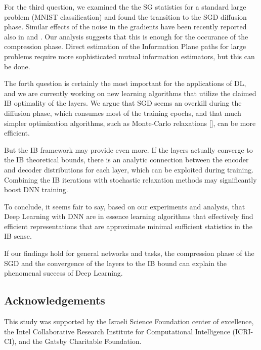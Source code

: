 \documentclass[11pt]{article}
\begin{document}
For the third question, we examined the the SG statistics for a standard large problem (MNIST classification) and found the transition to the SGD diffusion phase. Similar effects of the noise in the gradients have been recently reported also in \citet{2016arXiv161101353A} and \citet{DBLP:journals/corr/BalduzziFLLMM17}. Our analysis suggests that this is enough for the occurance of the compression phase. Direct estimation of the Information Plane paths for large problems require more sophisticated mutual information estimators, but this can be done. 

The forth question is certainly the most important for the applications of DL, and we are currently working on new learning algorithms that utilize the claimed IB optimality of the layers. We argue that SGD seems an overkill during the diffusion phase, which consumes most of the training epochs, and that much simpler optimization algorithms, such as Monte-Carlo relaxations [\citet{geman1988stochastic}], can be more efficient.  

But the IB framework may provide even more. If the layers actually converge to the IB theoretical bounds, there is an analytic connection between the encoder and decoder distributions for each layer, which can be exploited during training. Combining the IB iterations with stochastic relaxation methods may significantly boost DNN training.   



To conclude, it seems fair to say, based on our experiments and analysis, that Deep Learning with DNN 
are in essence learning algorithms that effectively find efficient representations that are approximate minimal sufficient statistics in the IB sense.  

If our findings hold for general networks and tasks, the compression phase of the SGD and the convergence of the layers to the IB bound can explain the phenomenal success of Deep Learning.




\subsection*{Acknowledgements} 
This study was supported by the Israeli Science Foundation center of excellence, the
Intel Collaborative Research Institute for Computational Intelligence (ICRI-CI),
and the Gatsby Charitable Foundation. 
\end{document}
